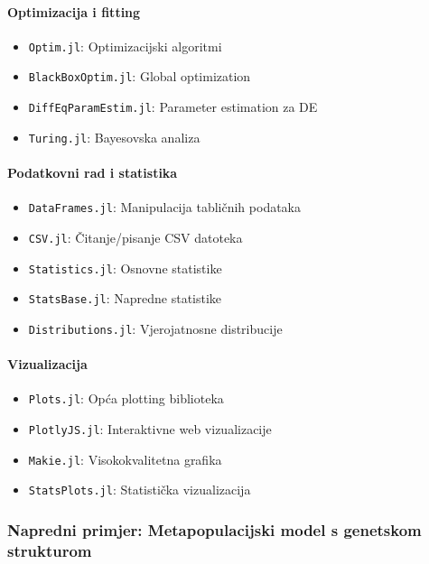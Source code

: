 \documentclass[11pt,oneside]{book}
\begin{document}
\paragraph{Optimizacija i fitting}

\begin{itemize}
	\item \texttt{Optim.jl}: Optimizacijski algoritmi
	\item \texttt{BlackBoxOptim.jl}: Global optimization
	\item \texttt{DiffEqParamEstim.jl}: Parameter estimation za DE
	\item \texttt{Turing.jl}: Bayesovska analiza
\end{itemize}

\paragraph{Podatkovni rad i statistika}

\begin{itemize}
	\item \texttt{DataFrames.jl}: Manipulacija tabličnih podataka
	\item \texttt{CSV.jl}: Čitanje/pisanje CSV datoteka
	\item \texttt{Statistics.jl}: Osnovne statistike
	\item \texttt{StatsBase.jl}: Napredne statistike
	\item \texttt{Distributions.jl}: Vjerojatnosne distribucije
\end{itemize}

\paragraph{Vizualizacija}

\begin{itemize}
	\item \texttt{Plots.jl}: Opća plotting biblioteka
	\item \texttt{PlotlyJS.jl}: Interaktivne web vizualizacije
	\item \texttt{Makie.jl}: Visokokvalitetna grafika
	\item \texttt{StatsPlots.jl}: Statistička vizualizacija
\end{itemize}

\subsubsection{Napredni primjer: Metapopulacijski model s genetskom strukturom}
\end{document}
